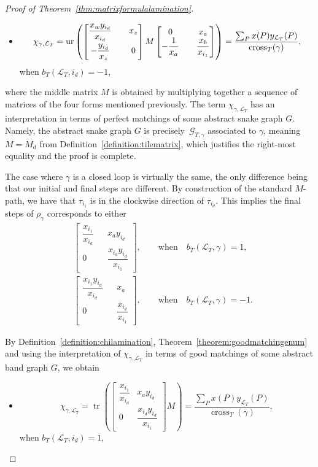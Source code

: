 \documentclass[10pt,a4paper]{amsart}
\numberwithin{equation}{section}
\theoremstyle{definition}
\begin{document}
\begin{proof}[Proof of Theorem~\ref{thm:matrixformulalamination}]
\begin{itemize}
\item \[
\chi_{\gamma, \mathcal{L}_{T}}=\operatorname{ur}\left(\begin{bmatrix}
\dfrac{x_w y_{i_d}}{x_{i_d}} && x_{z}\vspace{1mm}\\
-\dfrac{y_{i_d}}{x_{z}} && 0
\end{bmatrix}
M
\begin{bmatrix}
0 && x_a\\
-\dfrac{1}{x_a} && \dfrac{x_b}{x_{i_1}}
\end{bmatrix}\right)=\frac{\sum_P x(P)y_{\mathcal{L}_T}(P)}{\operatorname{cross}_T(\gamma)},\]
 when $ b_{T}(\mathcal{L}_{T}, i_{d})=-1$,
\end{itemize}
where the middle matrix $M$ is obtained by multiplying together a sequence of matrices of the four forms mentioned previously. The term $\chi_{\gamma, \mathcal{L}_T}$ has an interpretation in terms of perfect matchings of some abstract snake graph $G$. Namely, the abstract snake graph $G$ is precisely~$\mathcal{G}_{T, \gamma}$ associated to $\gamma$, meaning $M=M_d$ from Definition~\ref{definition:tilematrix}, which justifies the right-most equality and the proof is complete.

The case where $\gamma$ is a closed loop is virtually the same, the only difference being that our initial and final steps are different. By construction of the standard $M$-path, we have that $\tau_{i_1}$ is in the clockwise direction of $\tau_{i_d}$. This implies the final steps of $\rho_{\gamma}$ corresponds to either
\begin{align*}
 &\begin{bmatrix}
 \dfrac{x_{i_1}}{x_{i_d}} && x_a y_{i_d}\\
 0 && \dfrac{x_{i_d}y_{i_d}}{x_{i_1}}
 \end{bmatrix} ,\qquad\text{when}\quad b_T(\mathcal{L}_T, \gamma)=1,\\
 &\begin{bmatrix}
 \dfrac{x_{i_1}y_{i_d}}{x_{i_d}} && x_a\\
 0 && \dfrac{x_{i_d}}{x_{i_1}}
 \end{bmatrix} ,\qquad\text{when}\quad b_T(\mathcal{L}_T, \gamma)=-1.
\end{align*}

By Definition~\ref{definition:chilamination}, Theorem~\ref{theorem:goodmatchingenum} and using the interpretation of $\chi_{\gamma, \mathcal{L}_T}$ in terms of good matchings of some abstract band graph $G$, we obtain
\begin{itemize}\itemsep=0pt
 \item \[
 \chi_{\gamma, \mathcal{L}_{T}}=\operatorname{tr}\left(\begin{bmatrix}
\dfrac{x_{i_1}}{x_{i_d}} & x_{a}y_{i_d}\\
0 & \dfrac{x_{i_d}y_{i_d}}{x_{i_1}}
\end{bmatrix}
M\right)=\frac{\sum_P x(P)y_{\mathcal{L}_T}(P)}{\operatorname{cross}_T(\gamma)},
\]
 when $ b_{T}(\mathcal{L}_{T}, i_{d})=1$,


\end{itemize}
\end{proof}
\end{document}
